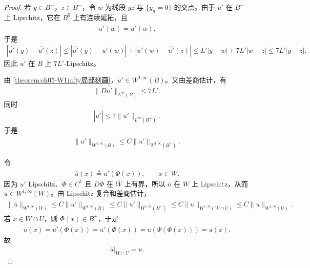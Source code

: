 \documentclass[../../main.tex]{subfiles}%
\begin{document}
\begin{proof}
若 \(y\in B^+\)，\(z\in B^-\)，令 \(w\) 为线段 \(yz\) 与 \(\{y_n=0\}\) 的交点。由于 \(u'\) 在 \(B^+\) 上 Lipschitz，它在 \(B^0\) 上有连续延拓，且
\begin{align*}
\overline{u'}(w)=u'(w).
\end{align*}
于是
\begin{align*}
|\overline{u'}(y)-\overline{u'}(z)|
\leqslant|\overline{u'}(y)-u'(w)|+|u'(w)-\overline{u'}(z)|\leqslant L'|y-w|+7L'|w-z|
\leqslant7L'|y-z|.
\end{align*}
因此 \(\overline{u'}\) 在 \(B\) 上 \(7L'\)-Lipschitz。

由 \cref{theorem:ch05-W1infty局部刻画}，\(\overline{u'}\in W^{1,\infty}(B)\)。又由差商估计，有
\begin{align*}
\|D\overline{u'}\|_{L^\infty(B)}\leqslant7L'.
\end{align*}
同时
\begin{align*}
|\overline{u'}|\leqslant7\|u'\|_{L^\infty(B^+)}.
\end{align*}
于是
\begin{align}
\|\overline{u'}\|_{W^{1,\infty}(B)}
\leqslant C\|u'\|_{W^{1,\infty}(B^+)}.
\label{eq:延拓u'-W1infty}
\end{align}

令
\begin{align*}
\overline u(x)\triangleq\overline{u'}(\Phi(x)),\qquad x\in W.
\end{align*}
因为 \(\overline{u'}\) Lipschitz、\(\Phi\in C^1\) 且 \(D\Phi\) 在 \(\overline W\) 上有界，所以 \(\overline u\) 在 \(W\) 上 Lipschitz，从而 \(\overline u\in W^{1,\infty}(W)\)。由 Lipschitz 复合和差商估计，
\begin{align}
\|\overline u\|_{W^{1,\infty}(W)}
\leqslant C\|\overline{u'}\|_{W^{1,\infty}(B)}
\leqslant C\|u'\|_{W^{1,\infty}(B^+)}
\leqslant C\|u\|_{W^{1,\infty}(W\cap U)}
\leqslant C\|u\|_{W^{1,\infty}(U)}.
\label{eq:局部延拓-W1infty}
\end{align}
若 \(x\in W\cap U\)，则 \(\Phi(x)\in B^+\)，于是
\begin{align*}
\overline u(x)
=\overline{u'}(\Phi(x))
=u'(\Phi(x))
=u(\Psi(\Phi(x)))
=u(x).
\end{align*}
故
\begin{align*}
\overline u\big|_{W\cap U}=u.
\end{align*}


\end{proof}
\end{document}
